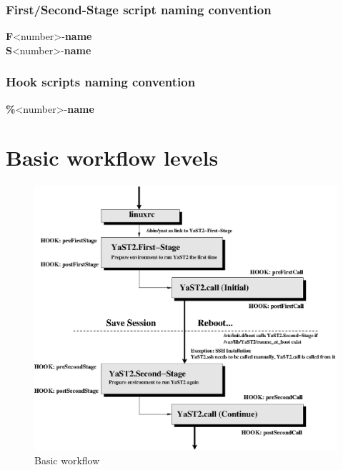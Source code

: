 \subsubsection{First/Second-Stage script naming convention}
\begin{Command}{8cm}
\textbf{F}<number>-\textbf{name}\\
\textbf{S}<number>-\textbf{name}
\end{Command}

\subsubsection{Hook scripts naming convention} 
\begin{Command}{8cm}
\textbf{\%}<number>-\textbf{name}
\end{Command}

\section{Basic workflow levels}
\begin{figure}[h]
\caption{Basic workflow}
\includegraphics[scale=1]{pictures/basic.eps}
\end{figure}

